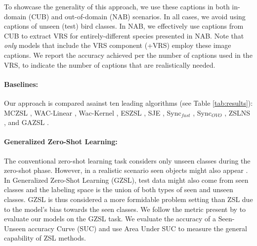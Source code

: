 \documentclass[11pt,a4paper]{article}
\begin{document}
To showcase the generality of this approach, we use these captions in both in-domain (CUB) and out-of-domain (NAB) scenarios. In all cases, we avoid using captions of unseen (test) bird classes. In NAB, we effectively use captions from CUB to extract VRS for entirely-different species presented in NAB. Note that {\em only} models that include the VRS component (+VRS) employ these image captions. We report the accuracy achieved per the number of captions used in the VRS, to indicate the number of captions that are realistically needed.





\paragraph{Baselines:} 
Our approach is compared asainst ten leading algorithms (see Table \ref{tab:results}): MCZSL \citep{akata2016multi}, WAC-Linear \citep{elhoseiny2013write}, Wac-Kernel  \citep{elhoseiny2016write}, ESZSL   \citep{romera2015embarrassingly}, SJE  \citep{akata2015evaluation}, Sync$_{fast}$ \citep{changpinyo2016synthesized}, Sync$_{OVO}$ \citep{changpinyo2016synthesized},
ZSLNS \citep{qiao2016less}, and GAZSL \citep{zhu2018generative}. 


\paragraph{Generalized Zero-Shot Learning:} 
The conventional zero-shot learning task considers only unseen classes during the zero-shot phase. However, in a realistic scenario seen objects might also appear \cite{chao2016empirical}. In Generalized Zero-Shot Learning (GZSL), test data might also come from seen classes and the labeling space is the union of both types of seen and unseen classes. GZSL is thus considered a more formidable problem setting
than ZSL due to the model's bias towards the seen classes.
We follow the metric present by \citet{chao2016empirical} to evaluate our models on the GZSL task. We evaluate the accuracy of a Seen-Unseen accuracy Curve (SUC) and use Area Under SUC to measure the general capability of ZSL methods.
\end{document}
